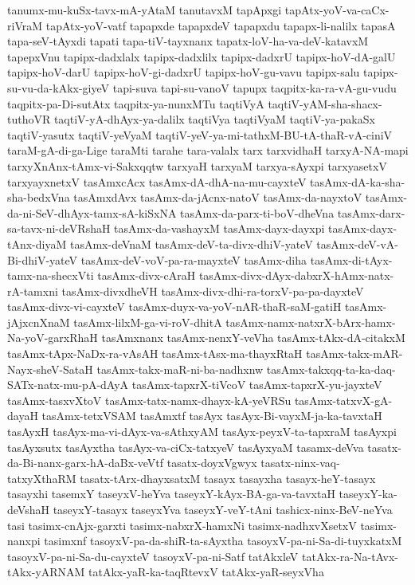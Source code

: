 {tanumx-mu-kuSx-tavx-mA-yAtaM
tanutavxM
tapApxgi
tapAtx-yoV-va-caCx-riVraM
tapAtx-yoV-vatf
tapapxde
tapapxdeV
tapapxdu
tapapx-li-nalilx
tapasA
tapa-seV-tAyxdi
tapati
tapa-tiV-tayxnanx
tapatx-loV-ha-va-deV-katavxM
tapepxVnu
tapipx-dadxlalx
tapipx-dadxlilx
tapipx-dadxrU
tapipx-hoV-dA-galU
tapipx-hoV-darU
tapipx-hoV-gi-dadxrU
tapipx-hoV-gu-vavu
tapipx-salu
tapipx-su-vu-da-kAkx-giyeV
tapi-suva
tapi-su-vanoV
tapupx
taqpitx-ka-ra-vA-gu-vudu
taqpitx-pa-Di-sutAtx
taqpitx-ya-nunxMTu
taqtiVyA
taqtiV-yAM-sha-shacx-tuthoVR
taqtiV-yA-dhAyx-ya-dalilx
taqtiVya
taqtiVyaM
taqtiV-ya-pakaSx
taqtiV-yasutx
taqtiV-yeVyaM
taqtiV-yeV-ya-mi-tathxM-BU-tA-thaR-vA-ciniV
taraM-gA-di-ga-Lige
taraMti
tarahe
tara-valalx
tarx
tarxvidhaH
tarxyA-NA-mapi
tarxyXnAnx-tAmx-vi-Sakxqqtw
tarxyaH
tarxyaM
tarxya-sAyxpi
tarxyasetxV
tarxyayxnetxV
tasAmxcAcx
tasAmx-dA-dhA-na-mu-cayxteV
tasAmx-dA-ka-sha-sha-bedxVna
tasAmxdAvx
tasAmx-da-jAcnx-natoV
tasAmx-da-nayxtoV
tasAmx-da-ni-SeV-dhAyx-tamx-sA-kiSxNA
tasAmx-da-parx-ti-boV-dheVna
tasAmx-darx-sa-tavx-ni-deVRshaH
tasAmx-da-vashayxM
tasAmx-dayx-dayxpi
tasAmx-dayx-tAnx-diyaM
tasAmx-deVnaM
tasAmx-deV-ta-divx-dhiV-yateV
tasAmx-deV-vA-Bi-dhiV-yateV
tasAmx-deV-voV-pa-ra-mayxteV
tasAmx-diha
tasAmx-di-tAyx-tamx-na-shecxVti
tasAmx-divx-cAraH
tasAmx-divx-dAyx-dabxrX-hAmx-natx-rA-tamxni
tasAmx-divxdheVH
tasAmx-divx-dhi-ra-torxV-pa-pa-dayxteV
tasAmx-divx-vi-cayxteV
tasAmx-duyx-va-yoV-nAR-thaR-saM-gatiH
tasAmx-jAjxcnXnaM
tasAmx-lilxM-ga-vi-roV-dhitA
tasAmx-namx-natxrX-bArx-hamx-Na-yoV-garxRhaH
tasAmxnanx
tasAmx-nenxY-veVha
tasAmx-tAkx-dA-citakxM
tasAmx-tApx-NaDx-ra-vAsAH
tasAmx-tAsx-ma-thayxRtaH
tasAmx-takx-mAR-Nayx-sheV-SataH
tasAmx-takx-maR-ni-ba-nadhxnw
tasAmx-takxqq-ta-ka-daq-SATx-natx-mu-pA-dAyA
tasAmx-tapxrX-tiVcoV
tasAmx-tapxrX-yu-jayxteV
tasAmx-tasxvXtoV
tasAmx-tatx-namx-dhayx-kA-yeVRSu
tasAmx-tatxvX-gA-dayaH
tasAmx-tetxVSAM
tasAmxtf
tasAyx
tasAyx-Bi-vayxM-ja-ka-tavxtaH
tasAyxH
tasAyx-ma-vi-dAyx-va-sAthxyAM
tasAyx-peyxV-ta-tapxraM
tasAyxpi
tasAyxsutx
tasAyxtha
tasAyx-va-ciCx-tatxyeV
tasAyxyaM
tasamx-deVva
tasatx-da-Bi-nanx-garx-hA-daBx-veVtf
tasatx-doyxVgwyx
tasatx-ninx-vaq-tatxyXthaRM
tasatx-tArx-dhayxsatxM
tasayx
tasayxha
tasayx-heY-tasayx
tasayxhi
tasemxY
taseyxV-heYva
taseyxY-kAyx-BA-ga-va-tavxtaH
taseyxY-ka-deVshaH
taseyxY-tasayx
taseyxYva
taseyxY-veY-tAni
tashicx-ninx-BeV-neYva
tasi
tasimx-cnAjx-garxti
tasimx-nabxrX-hamxNi
tasimx-nadhxvXsetxV
tasimx-nanxpi
tasimxnf
tasoyxV-pa-da-shiR-ta-sAyxtha
tasoyxV-pa-ni-Sa-di-tuyxkatxM
tasoyxV-pa-ni-Sa-du-cayxteV
tasoyxV-pa-ni-Satf
tatAkxleV
tatAkx-ra-Na-tAvx-tAkx-yARNAM
tatAkx-yaR-ka-taqRtevxV
tatAkx-yaR-seyxVha
}

